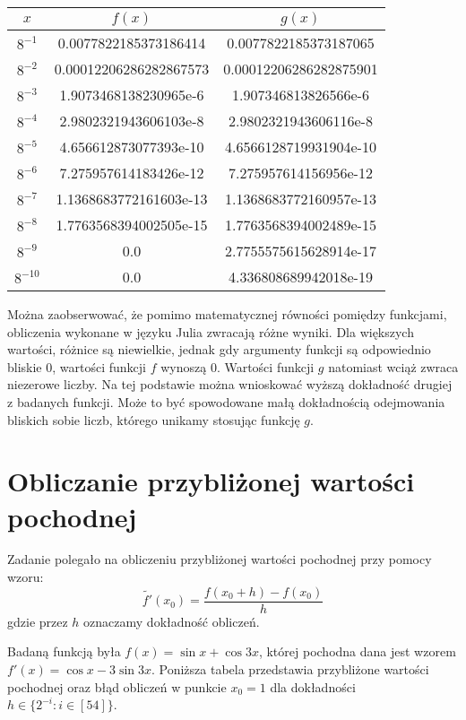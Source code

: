 \documentclass{article}
\begin{document}
\begin{center}
  \begin{tabular}{| c | c | c |}
    \hline
    $x$ & $f(x)$ & $g(x)$ \\
    \hline
    $8^{-1}$ & 0.0077822185373186414 & 0.0077822185373187065 \\
    $8^{-2}$ & 0.00012206286282867573 & 0.00012206286282875901 \\
    $8^{-3}$ & 1.9073468138230965e-6 & 1.907346813826566e-6 \\
    $8^{-4}$ & 2.9802321943606103e-8 & 2.9802321943606116e-8 \\
    $8^{-5}$ & 4.656612873077393e-10 & 4.6566128719931904e-10 \\
    $8^{-6}$ & 7.275957614183426e-12 & 7.275957614156956e-12 \\
    $8^{-7}$ & 1.1368683772161603e-13 & 1.1368683772160957e-13 \\
    $8^{-8}$ & 1.7763568394002505e-15 & 1.7763568394002489e-15 \\
    $8^{-9}$ & 0.0 & 2.7755575615628914e-17 \\
    $8^{-10}$ & 0.0 & 4.336808689942018e-19 \\
    \hline
  \end{tabular}
\end{center}

Można zaobserwować, że pomimo matematycznej równości pomiędzy funkcjami, obliczenia wykonane w języku Julia zwracają różne wyniki.
Dla większych wartości, różnice są niewielkie, jednak gdy argumenty funkcji są odpowiednio bliskie $0$, wartości funkcji $f$ wynoszą $0$.
Wartości funkcji $g$ natomiast wciąż zwraca niezerowe liczby.
Na tej podstawie można wnioskować wyższą dokładność drugiej z badanych funkcji.
Może to być spowodowane małą dokładnością odejmowania bliskich sobie liczb, którego unikamy stosując funkcję $g$.

\section{Obliczanie przybliżonej wartości pochodnej}

Zadanie polegało na obliczeniu przybliżonej wartości pochodnej przy pomocy wzoru:
$$
\widetilde{f'}(x_0) = \frac{f(x_0+h) - f(x_0)}{h}
$$
gdzie przez $h$ oznaczamy dokładność obliczeń.

Badaną funkcją była $f(x) = \sin x + \cos 3x$, której pochodna dana jest wzorem $f'(x) = \cos x - 3 \sin 3x$.
Poniższa tabela przedstawia przybliżone wartości pochodnej oraz błąd obliczeń w punkcie $x_0 = 1$ dla dokładności $h \in \{2^{-i}: i \in [54]\}$.
\end{document}
